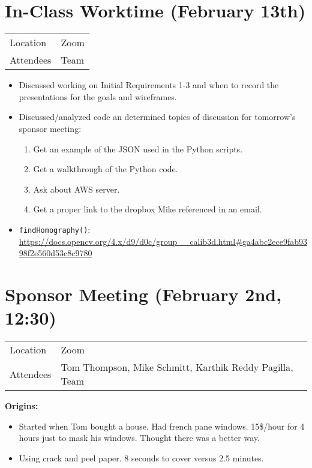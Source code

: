 \documentclass[a4paper, 10pt]{article}
\begin{document}
\section{In-Class Worktime (February 13th)}
\label{sec:org39c2975}

\begin{center}
\begin{tabular}{ll}
Location & Zoom\\
Attendees & Team\\
\end{tabular}
\end{center}

\begin{itemize}
\item Discussed working on Initial Requirements 1-3 and when to record the presentations for the goals and wireframes.
\item Discussed/analyzed code an determined topics of discussion for tomorrow's sponsor meeting:
\begin{enumerate}
\item Get an example of the JSON used in the Python scripts.
\item Get a walkthrough of the Python code.
\item Ask about AWS server.
\item Get a proper link to the dropbox Mike referenced in an email.
\end{enumerate}

\item \texttt{findHomography()}: \url{https://docs.opencv.org/4.x/d9/d0c/group\_\_calib3d.html\#ga4abc2ece9fab9398f2e560d53c8c9780}
\end{itemize}
\section{Sponsor Meeting (February 2nd, 12:30)}
\label{sec:org7469f08}

\begin{center}
\begin{tabular}{ll}
Location & Zoom\\
Attendees & Tom Thompson, Mike Schmitt, Karthik Reddy Pagilla, Team\\
\end{tabular}
\end{center}

\textbf{Origins:}
\begin{itemize}
\item Started when Tom bought a house. Had french pane windows. 15\$/hour for 4 hours just to mask his windows. Thought there was a better way.
\item Using crack and peel paper. 8 seconds to cover versus 2.5 minutes.
\end{itemize}
\end{document}
